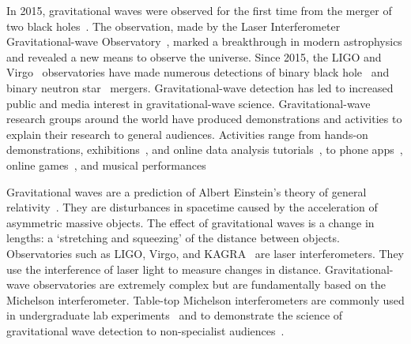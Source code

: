\documentclass[paper-main.tex]{subfiles}
\begin{document}
In 2015, gravitational waves were observed for the first time from the merger of two black holes~\cite{GW150914}. 
The observation, made by the Laser Interferometer Gravitational-wave Observatory~\citep[LIGO]{AdvancedLIGO:2015}, marked a breakthrough in modern astrophysics and revealed a new means to observe the universe. 
Since 2015, the LIGO and Virgo~\cite{AdvancedVirgo:2015} observatories have made numerous detections of binary black hole~\cite{GW151226,GW170104,GW170814} and binary neutron star~\cite{GW170817,GW170817multi,GW190425} mergers. 
Gravitational-wave detection has led to increased public and media interest in gravitational-wave science. 
Gravitational-wave research groups around the world have produced demonstrations and activities to explain their research to general audiences. 
Activities range from hands-on demonstrations, exhibitions~\cite{TTExhibit:2020,LIGOScienceEducationCentre:online,GravityDiscoveryCentre:online}, and online data analysis tutorials~\cite{GWOSC:online,LOSC:2015}, to phone apps~\cite{LaserLabs:online,SciVR:online,chirp:online}, online games~\cite{BlackHoleHunter:online}, and musical performances~\cite{ArthurJeffesMusic:online,GravitySynthLeonTrimble:online}%

Gravitational waves are a prediction of Albert Einstein's theory of general relativity~\cite{Einstein:1916}. 
They are disturbances in spacetime caused by the acceleration of asymmetric massive objects. 
The effect of gravitational waves is a change in lengths: a `stretching and squeezing' of the distance between objects.
Observatories such as LIGO, Virgo, and KAGRA~\cite{KAGRA:2013} are laser interferometers.
They use the interference of laser light to measure changes in distance. 
Gravitational-wave observatories are extremely complex but are fundamentally based on the Michelson interferometer. 
Table-top Michelson interferometers are commonly used in undergraduate lab experiments~\cite{UgoliniEtAl:2019} and to demonstrate the science of gravitational wave detection to non-specialist audiences~\cite{ThorLabsIFO,NikhefIFO,TTExhibit:2020,LIGOIFOGlue,LIGOIFOMagnets}.
\end{document}
